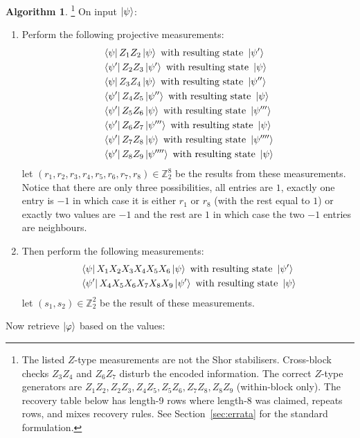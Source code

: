 \documentclass[12pt]{article}
\theoremstyle{plain}
\theoremstyle{definition}
\newtheorem{algorithm}[thm]{Algorithm}
\newcommand{\bb}[1]{\mathbb{#1}}
\begin{document}
\begin{algorithm}\footnote{The listed $Z$-type measurements are not the Shor stabilisers. Cross-block checks $Z_3Z_4$ and $Z_6Z_7$ disturb the encoded information. The correct $Z$-type generators are $Z_1Z_2,Z_2Z_3,Z_4Z_5,Z_5Z_6,Z_7Z_8,Z_8Z_9$ (within-block only). The recovery table below has length-9 rows where length-8 was claimed, repeats rows, and mixes recovery rules. See Section~\ref{sec:errata} for the standard formulation.}
On input $\ket{\psi}$:
\begin{enumerate}
\item Perform the following projective measurements:
\begin{align*}
&\bra{\psi}Z_1Z_2\ket{\psi}\text{ with resulting state }\ket{\psi'}\\
&\bra{\psi'}Z_2Z_3\ket{\psi'}\text{ with resulting state }\ket{\psi}\\
&\bra{\psi}Z_3Z_4\ket{\psi}\text{ with resulting state }\ket{\psi''}\\
&\bra{\psi'}Z_4Z_5\ket{\psi''}\text{ with resulting state }\ket{\psi}\\
&\bra{\psi'}Z_5Z_6\ket{\psi}\text{ with resulting state }\ket{\psi'''}\\
&\bra{\psi'}Z_6Z_7\ket{\psi'''}\text{ with resulting state }\ket{\psi}\\
&\bra{\psi'}Z_7Z_8\ket{\psi}\text{ with resulting state }\ket{\psi''''}\\
&\bra{\psi'}Z_8Z_9\ket{\psi''''}\text{ with resulting state }\ket{\psi}
\end{align*}
let $(r_1,r_2,r_3,r_4,r_5,r_6,r_7,r_8) \in \bb{Z}_2^8$ be the results from these measurements. Notice that there are only three possibilities, all entries are $1$, exactly one entry is $-1$ in which case it is either $r_1$ or $r_8$ (with the rest equal to $1$) or exactly two values are $-1$ and the rest are $1$ in which case the two $-1$ entries are neighbours.
\item Then perform the following measurements:
\begin{align*}
&\bra{\psi}X_1X_2X_3X_4X_5X_6\ket{\psi}\text{ with resulting state }\ket{\psi'}\\
&\bra{\psi'}X_4X_5X_6X_7X_8X_9\ket{\psi'}\text{ with resulting state }\ket{\psi}
\end{align*}
let $(s_1,s_2) \in \bb{Z}_2^2$ be the result of these measurements.
\end{enumerate}
\item Now retrieve $\ket{\varphi}$ based on the values:
\begin{center}

\end{center}
\end{algorithm}
\end{document}
